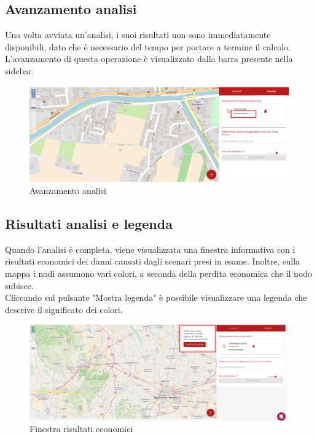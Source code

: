 \subsection{Avanzamento analisi}
	Una volta avviata un'analisi, i suoi risultati non sono immediatamente disponibili, dato che è necessario del tempo per portare a termine il calcolo. L'avanzamento di questa operazione è visualizzato dalla barra presente nella sidebar.
	
	\begin{figure}[H]
		\centering
		\includegraphics[width=\textwidth]{img/avanzamento_analisi.png}
		\caption{Avanzamento analisi}
	\end{figure}

\subsection{Risultati analisi e legenda}
	Quando l'analisi è completa, viene visualizzata una finestra informativa con i risultati economici dei danni causati dagli scenari presi in esame.
	Inoltre, sulla mappa i nodi assumono vari colori, a seconda della perdita economica che il nodo subisce.\\
	Cliccando sul pulsante "Mostra legenda" è possibile visualizzare una legenda che descrive il significato dei colori.

	\begin{figure}[H]
		\centering
		\includegraphics[width=\textwidth]{img/finestra_economica.png}
		\caption{Finestra risultati economici}
	\end{figure}

